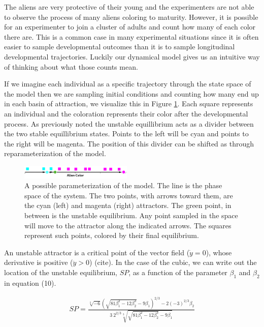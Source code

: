 \documentclass[letterpaper]{article}
\begin{document}
The aliens are very protective of their young and the experimenters are not able
to observe the process of many aliens coloring to maturity. However,
it is possible for an experimenter to join a cluster of adults and count
how many of each color there are. This is a common case in many experimental 
situations since it is often
easier to sample developmental outcomes than it is to sample longitudinal developmental
trajectories. Luckily our dynamical model gives us an intuitive way of thinking about
what those counts mean. 

If we imagine each individual as a specific trajectory through
the state space of the model then we are sampling initial conditions 
and counting how many end up in each basin of attraction, we visualize this 
in Figure \ref{basins}. Each
square represents an individual and the coloration represents their color after
the developmental process. As previously noted the unstable equillibrium acts as a
divider between the two stable equillibrium states. 
Points to
the left will be cyan and points to the right will be magenta. The position of 
this divider can be shifted as through reparameterization of the model.

\begin{figure}[t]
\begin{center}
\includegraphics[width=2.1in,angle=0]{./basins.png}
\caption{
  A possible parameterization of the  model. The line is the phase space
  of the system. The two points, with arrows toward them, are
  the cyan (left) and magenta (right) attractors. 
The green point, in between is the unstable equilibrium. Any point sampled 
in the space will move to the attractor along the indicated arrows. The 
squares represent such points, colored by their final equilibrium.}
\label{basins}
\end{center}
\end{figure}

An unstable attractor is a critical point of the vector field ($\dot{y} = 0$),
whose derivative is positive ($\ddot{y} > 0$) (cite). In the case of the cubic,
we can write out the location of the unstable equilibrium, $SP$, as a function of
the parameter $\beta_1$ and $\beta_2$ in equation (10).

\begin{eqnarray}
SP = \frac{\sqrt[3]{-6} 
\left(\sqrt{81 \beta_1^2-12 \beta_2^3}-9 \beta_1\right)^{2/3}-2 
(-3)^{2/3} \beta_2}{3\ 2^{2/3} \sqrt[3]
{\sqrt{81 \beta_1^2-12 \beta_2^3}-9 \beta_1}}
\end{eqnarray}
\end{document}
